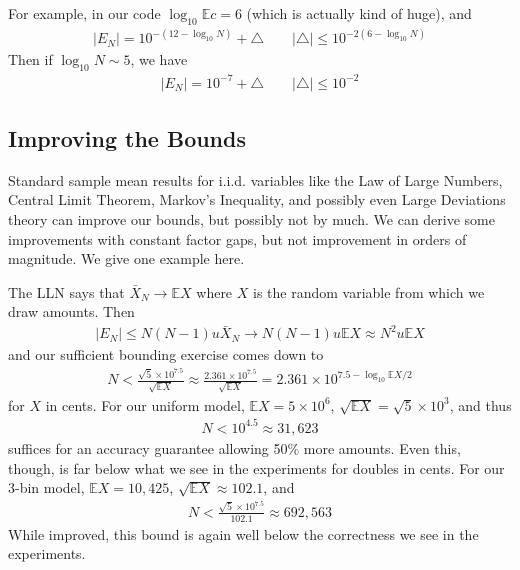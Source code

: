 \documentclass[11pt, oneside]{amsart}   	%
\begin{document}
For example, in our code $\log_{10}\mathbb{E}c = 6$ (which is actually kind of huge), and 
\begin{align*}
    |E_N| = 10^{-( 12 - \log_{10}N )} + \triangle
    \quad\quad
    |\triangle| \leq 10^{-2 ( 6 - \log_{10}N )}
\end{align*}
Then if $\log_{10}N \sim 5$, we have 
\begin{align*}
    |E_N| = 10^{-7} + \triangle
    \quad\quad
    |\triangle| \leq 10^{-2}
\end{align*}

\subsection{Improving the Bounds}

Standard sample mean results for i.i.d. variables like the Law of Large Numbers, Central Limit Theorem, Markov's Inequality, and possibly even Large Deviations theory can improve our bounds, but possibly not by much. We can derive some improvements with constant factor gaps, but not improvement in orders of magnitude. We give one example here. 

The LLN says that $\bar{X}_N \to \mathbb{E}X$ where $X$ is the random variable from which we draw amounts. Then 
\begin{align*}
    | E_N | \leq N(N-1)u \bar{X}_N \to N(N-1)u \mathbb{E}X \approx N^2 u \mathbb{E}X
\end{align*}
and our sufficient bounding exercise comes down to 
\begin{align*}
    N < \frac{ \sqrt{5} \times 10^{7.5} }{ \sqrt{ \mathbb{E}X } }
    	\approx \frac{ 2.361 \times 10^{7.5} }{ \sqrt{ \mathbb{E}X } }
	= 2.361 \times 10^{7.5 - \log_{10} \mathbb{E}X / 2}
\end{align*}
for $X$ in cents. For our uniform model, $\mathbb{E}X = 5 \times 10^6$, $\sqrt{\mathbb{E}X} = \sqrt{5} \times 10^3$, and thus
\begin{align*}
    N < 10^{4.5} \approx 31,623
\end{align*}
suffices for an accuracy guarantee allowing 50\% more amounts. Even this, though, is far below what we see in the experiments for doubles in cents. For our 3-bin model, $\mathbb{E}X = 10,425$, $\sqrt{\mathbb{E}X} \approx 102.1$, and 
\begin{align*}
    N < \frac{ \sqrt{5} \times 10^{7.5} }{ 102.1 } \approx 692,563
\end{align*}
While improved, this bound is again well below the correctness we see in the experiments. 
\end{document}
